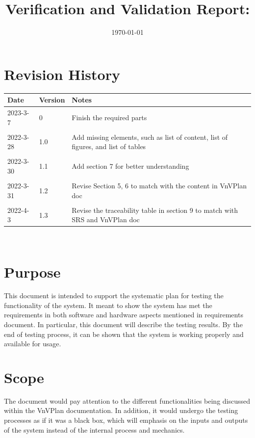 \documentclass[12pt, titlepage]{article}
\begin{document}
\title{Verification and Validation Report: \progname} 
\author{\authname}
\date{\today}
	
\maketitle


\section{Revision History}

\begin{tabularx}{\textwidth}{p{3cm}p{2cm}X}
\toprule {\bf Date} & {\bf Version} & {\bf Notes}\\
\midrule
2023-3-7 & 0 & Finish the required parts\\\\
2022-3-28 & 1.0 & Add missing elements, such as list of content, list of figures, and list of tables\\\\
2022-3-30 & 1.1 & Add section 7 for better understanding\\\\
2022-3-31 & 1.2 & Revise Section 5, 6 to match with the content in VnVPlan doc\\\\
2022-4-3 & 1.3 & Revise the traceability table in section 9 to match with SRS and VnVPlan doc\\
\bottomrule
\end{tabularx}
\newpage

\tableofcontents

\listoftables
~\newpage
{}

\section{Purpose}
This document is intended to support the systematic plan for testing the functionality of the system. It meant to show the system has met the requirements in both software and hardware aspects mentioned in requirements document. In particular, this document will describe the testing results. By the end of testing process, it can be shown that the system is working properly and available for usage.
\section{Scope}
The document would pay attention to the different functionalities being discussed within the VnVPlan documentation. In addition, it would undergo the testing processes as if it was a black box, which will emphasis on the inputs and outputs of the system instead of the internal process and mechanics.	
\end{document}
